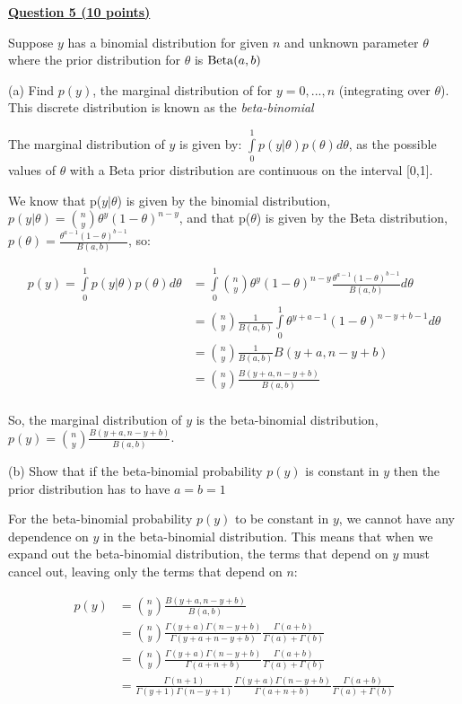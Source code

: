 \documentclass[12pt]{article}
\begin{document}
\pagebreak

{\underline{\bf Question 5 (10 points)}}  

Suppose $y$ has a binomial distribution for given $n$ and unknown parameter $\theta$ where the prior distribution for $\theta$ is ${\rm Beta} (a,b)$

(a) Find $p(y)$, the marginal distribution of for $y = 0, . . . , n$ (integrating over $\theta$).  This discrete distribution is known as the {\it beta-binomial}

The marginal distribution of $y$ is given by:
$\int\limits_0^1 p(y | \theta)p(\theta) d\theta$, as the possible values of $\theta$ with a Beta 
prior distribution are continuous on the interval [0,1].

We know that p($y | \theta$) is given by the binomial distribution, $p(y | \theta) = \binom{n}{y}\theta^y(1 - \theta)^{n-y}$, and
that p($\theta$) is given by the Beta distribution, $p(\theta) = \frac{\theta^{a-1}(1 - \theta)^{b-1}}{B(a,b)}$, so:

\begin{align*}
p(y) = \int\limits_0^1 p(y | \theta)p(\theta) d\theta &= \int\limits_0^1\binom{n}{y}\theta^y(1 - \theta)^{n-y}\frac{\theta^{a-1}(1 - \theta)^{b-1}}{B(a,b)}d\theta \\
&= \binom{n}{y}\frac{1}{B(a,b)}\int\limits_0^1\theta^{y + a - 1}(1 - \theta)^{n - y + b - 1}d\theta \\
&= \binom{n}{y}\frac{1}{B(a,b)}B(y + a, n - y + b) \\
&= \binom{n}{y}\frac{B(y + a, n - y + b)}{B(a,b)} \\
\end{align*}

So, the marginal distribution of $y$ is the beta-binomial distribution, $p(y) = \binom{n}{y}\frac{B(y + a, n - y + b)}{B(a,b)}$.

(b) Show that if the beta-binomial probability $p(y)$ is constant in $y$ then the prior distribution has to have $a = b = 1$

For the beta-binomial probability $p(y)$ to be constant in $y$, we cannot have any dependence on $y$ in the beta-binomial distribution.
This means that when we expand out the beta-binomial distribution, the terms that depend on $y$ must cancel out, leaving only the terms that depend on $n$:

\begin{align*}
p(y) &= \binom{n}{y}\frac{B(y + a, n - y + b)}{B(a,b)} \\
&= \binom{n}{y}\frac{\Gamma(y + a)\Gamma(n - y + b)}{\Gamma(y + a + n - y + b)}\frac{\Gamma(a + b)}{\Gamma(a) + \Gamma(b)} \\
&= \binom{n}{y}\frac{\Gamma(y + a)\Gamma(n - y + b)}{\Gamma(a + n + b)}\frac{\Gamma(a + b)}{\Gamma(a) + \Gamma(b)} \\
&= \frac{\Gamma(n+1)}{\Gamma(y+1)\Gamma(n-y+1)}\frac{\Gamma(y + a)\Gamma(n - y + b)}{\Gamma(a + n + b)}\frac{\Gamma(a + b)}{\Gamma(a) + \Gamma(b)} \\
\end{align*}
\end{document}
